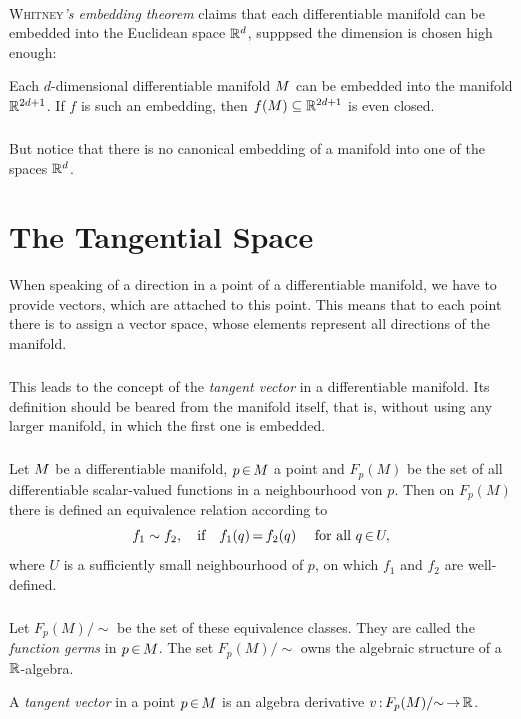 \documentclass[11pt,twoside]{article}
\begin{document}
\paragraph{}
\textsc{Whitney}\textit{'s embedding theorem} claims
that each differentiable manifold can be embedded
into the Euclidean space ${\mathbb{R}}^d$,
supppsed the dimension is chosen high enough:

\begin{theorem}
Each $d$-dimensional differentiable manifold ${M}$ can be embedded
into the manifold ${\mathbb{R}}^{2d+1}$.
If $f$ is such an embedding,
then $f({M}) \subseteq {\mathbb{R}}^{2d+1}$ is even closed.
\end{theorem}

\subparagraph{}
But notice that
there is no canonical embedding of a manifold into one of the spaces ${\mathbb{R}}^d$.

\section{The Tangential Space}
When speaking of a direction in a point of a differentiable manifold,
we have to provide vectors,
which are attached to this point.
This means
that to each point there is to assign a vector space,
whose elements represent all directions of the manifold.

\subparagraph{}
This leads to the concept of the \textit{tangent vector}
in a differentiable manifold.
Its definition should be beared from the manifold itself,
that is,
without using any larger manifold, in which the first one is embedded.

\subparagraph{}
Let ${M}$ be a differentiable manifold,
$p {\,\in\,} {M}$ a point and $F_p(M)$ be the set of
all differentiable scalar-valued functions
in a neighbourhood von $p$.
Then on $F_p(M)$ there is defined an equivalence relation according to
\[
f_1 \sim f_2, \quad \mbox{if} \quad
f_1(q) {\,=\,} f_2(q) \quad \mbox{ for all } q {\,\in\,} U,
\]
where $U$ is a sufficiently small neighbourhood of $p$,
on which $f_1$ and $f_2$ are well-defined.

\subparagraph{}
Let $F_p(M)/{\sim}$ be the set of these equivalence classes.
They are called the \textit{function germs} in $p {\,\in\,} {M}$.
The set $F_p(M)/{\sim}$ owns the algebraic structure of a ${\mathbb{R}}$-algebra.

\begin{definition}
A \textit{tangent vector} in a point $p {\,\in\,} {M}$
is an algebra derivative $v {\,:\,} F_p(M)/{\sim} {\,\to\,} {\mathbb{R}}$.
\end{definition}
\end{document}
